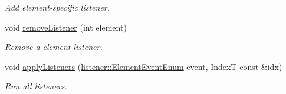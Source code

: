 \begin{DoxyCompactItemize}
\begin{DoxyCompactList}\small\item\em Add element-\/specific listener. \end{DoxyCompactList}\item 
void \hyperlink{structvt_1_1vrt_1_1collection_1_1_holder_a777a6cd6d587f484ba3787faa81f92a3}{remove\+Listener} (int element)
\begin{DoxyCompactList}\small\item\em Remove a element listener. \end{DoxyCompactList}\item 
void \hyperlink{structvt_1_1vrt_1_1collection_1_1_holder_a54b3fab8137d089b027f248badb56f2b}{apply\+Listeners} (\hyperlink{namespacevt_1_1vrt_1_1collection_1_1listener_a96ace4b58b3d91759e7abda5cc33b012}{listener\+::\+Element\+Event\+Enum} event, IndexT const \&idx)
\begin{DoxyCompactList}\small\item\em Run all listeners. \end{DoxyCompactList}\end{DoxyCompactItemize}
